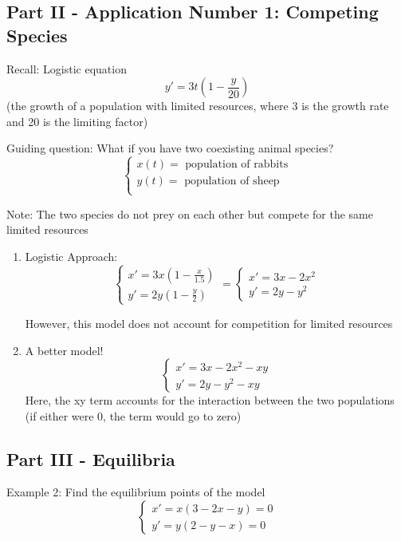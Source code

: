 \documentclass[12pt]{article}
\begin{document}
\subsection*{Part II - Application Number 1: Competing Species}
Recall: Logistic equation 
\[y' = 3t \left(1 - \frac{y}{20}\right)\]
(the growth of a population with limited resources, where 3 is the growth rate and 20 is the limiting factor)

Guiding question: What if you have two coexisting animal species?
\[\begin{cases}
    x(t) = \text{ population of rabbits}\\
    y(t) = \text{ population of sheep}\\
\end{cases}\]

Note: The two species do not prey on each other but compete for the same limited resources 

\begin{enumerate}
    \item Logistic Approach:
    \[\begin{cases}
        x' = 3x(1 - \frac{x}{1.5})\\
        y' = 2y(1 - \frac{y}{2})
    \end{cases} = \begin{cases}
        x' = 3x - 2x^2\\
        y' = 2y - y^2
    \end{cases}\]
    
    However, this model does not account for competition for limited resources
    
    \item A better model!
    \[\begin{cases}
        x' = 3x - 2x^2 - xy\\
        y' = 2y - y^2 - xy
    \end{cases}\]
    Here, the xy term accounts for the interaction between the two populations 
    (if either were 0, the term would go to zero)
\end{enumerate}

\subsection*{Part III - Equilibria}
Example 2: Find the equilibrium points of the model 
\[\begin{cases}
    x' = x(3 - 2x - y) = 0\\
    y' = y(2 - y - x) = 0
\end{cases}\]
\end{document}
